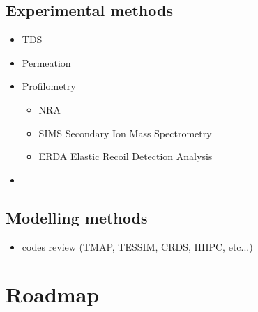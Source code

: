 \subsection{Experimental methods}
\begin{itemize}
    \item TDS
    \item Permeation
    \item Profilometry
    \begin{itemize}
        \item NRA
        \item SIMS Secondary Ion Mass Spectrometry
        \item ERDA Elastic Recoil Detection Analysis
    \end{itemize}
    \item 
\end{itemize}
\subsection{Modelling methods}
\begin{itemize}
    \item codes review (TMAP, TESSIM, CRDS, HIIPC, etc...)
\end{itemize}
\section{Roadmap}



